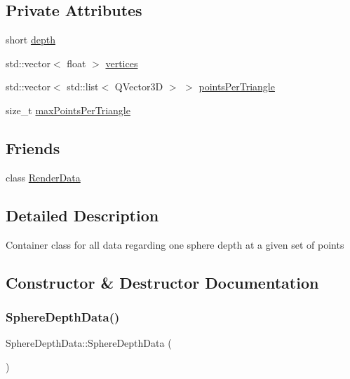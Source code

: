 \subsection*{Private Attributes}
\begin{DoxyCompactItemize}
\item 
short \hyperlink{struct_sphere_depth_data_a32dc63866d12b3102942e14bb28238ff}{depth}
\item 
std\+::vector$<$ float $>$ \hyperlink{struct_sphere_depth_data_a139a9131aa15308e012fc8190de2011d}{vertices}
\item 
std\+::vector$<$ std\+::list$<$ Q\+Vector3D $>$ $>$ \hyperlink{struct_sphere_depth_data_a9decfacc00300c153ecff80288b7413f}{points\+Per\+Triangle}
\item 
size\+\_\+t \hyperlink{struct_sphere_depth_data_a2c3d3f7d890da5ebb7ae989c648d169f}{max\+Points\+Per\+Triangle}
\end{DoxyCompactItemize}
\subsection*{Friends}
\begin{DoxyCompactItemize}
\item 
class \hyperlink{struct_sphere_depth_data_a85dbb35e50f4a9c4a1d0f0c783959bdb}{Render\+Data}
\end{DoxyCompactItemize}


\subsection{Detailed Description}
Container class for all data regarding one sphere depth at a given set of points 

\subsection{Constructor \& Destructor Documentation}
\mbox{\label{struct_sphere_depth_data_adf3b418ea38626e3d768240d257504ea}} 
\subsubsection{\texorpdfstring{Sphere\+Depth\+Data()}{SphereDepthData()}\hspace{0.1cm}{\footnotesize\ttfamily [1/2]}}
{\footnotesize\ttfamily Sphere\+Depth\+Data\+::\+Sphere\+Depth\+Data (\begin{DoxyParamCaption}{ }\end{DoxyParamCaption})\hspace{0.3cm}{\ttfamily [default]}}

